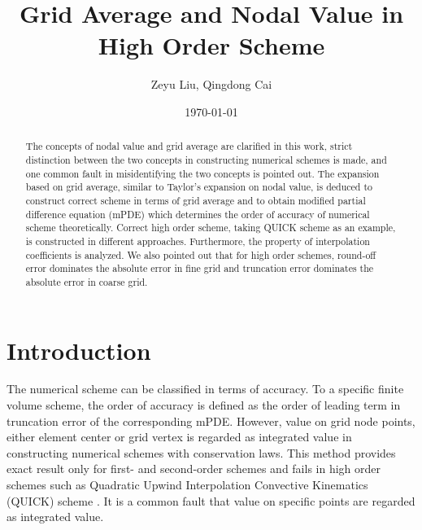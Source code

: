 \documentclass[]{article}
\title{Grid Average and Nodal Value in High Order Scheme}
\author{Zeyu Liu, Qingdong Cai}
\date{\today}
\begin{document}
\maketitle
\begin{abstract}
The concepts of nodal value and grid average are clarified in this work,
strict distinction between the two concepts in constructing
numerical schemes is made,  and one common fault in
misidentifying the two concepts is pointed out. 
The expansion based on grid average,
similar to Taylor's expansion on nodal value, is deduced to construct
correct scheme in terms of grid average and to obtain modified
partial difference equation (mPDE)
which determines the order of accuracy of numerical scheme theoretically.
Correct high order scheme, taking QUICK scheme as an example, is constructed in different
approaches. Furthermore, the property of interpolation coefficients is analyzed.
We also pointed out that for high order schemes, round-off error
dominates the absolute error in fine grid and truncation
error dominates the absolute error in coarse grid.
\end{abstract}
\tableofcontents

\section{Introduction}\label{sec:intro}
The numerical scheme can be classified in terms of accuracy. To a 
specific finite volume scheme, the order of accuracy is defined as the order of leading term
in truncation error of the corresponding mPDE.
However, value on grid node points, either element center or grid vertex is
regarded as integrated value in constructing numerical schemes with
conservation laws.
This method provides exact result only for first- and second-order 
schemes and fails in high order schemes such as Quadratic Upwind Interpolation
Convective Kinematics (QUICK) scheme \cite{leonard1979stable}.
It is a common fault that value on specific points are regarded as
integrated value.
\end{document}
